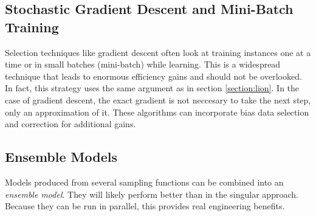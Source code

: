\documentclass[twoside]{article}
\begin{document}
\subsection{Stochastic Gradient Descent and Mini-Batch Training}

Selection techniques like gradient descent often look at training instances one at a time or in small batches (mini-batch) while learning. This is a widespread technique that leads to enormous efficiency gains and should not be overlooked. In fact, this strategy uses the same argument as in section \ref{section:lion}. In the case of gradient descent, the exact gradient is not neccesary to take the next step, only an approximation of it. These algorithms can incorporate bias data selection and correction for additional gains.

\subsection{Ensemble Models}

Models produced from several sampling functions can be combined into an \textit{ensemble model}. They will likely perform better than in the singular approach. Because they can be run in parallel, this provides real engineering benefits.
\end{document}
